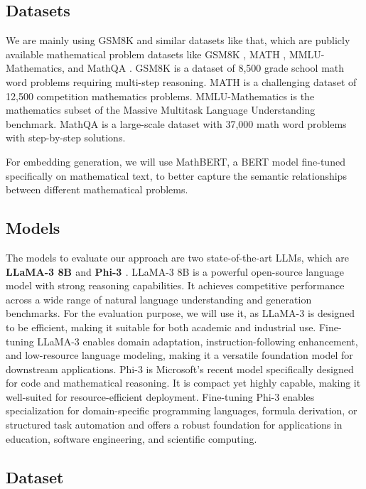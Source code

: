 \documentclass{article}
\begin{document}
\subsection{Datasets}

We are mainly using GSM8K and similar datasets like that, which are  publicly available mathematical problem datasets like GSM8K \cite{cobbe2021gsm8k}, MATH \cite{hendrycks2021math}, MMLU-Mathematics, and MathQA \cite{amini2019mathqa}. GSM8K is a dataset of 8,500 grade school math word problems requiring multi-step reasoning. MATH is a challenging dataset of 12,500 competition mathematics problems. MMLU-Mathematics is the mathematics subset of the Massive Multitask Language Understanding benchmark. MathQA is a large-scale dataset with 37,000 math word problems with step-by-step solutions.

For embedding generation, we will use MathBERT, a BERT model \cite{devlin2018bert} fine-tuned specifically on mathematical text, to better capture the semantic relationships between different mathematical problems.

\subsection{Models}

The models to evaluate our approach are two state-of-the-art LLMs, which are \textbf{LLaMA-3 8B \cite{touvron2023llama}} and \textbf{Phi-3 \cite{abdin2023phi}}. LLaMA-3 8B is a powerful open-source language model with strong reasoning capabilities. It achieves competitive performance across a wide range of natural language understanding and generation benchmarks. For the evaluation purpose, we will use it, as LLaMA-3 is designed to be efficient, making it suitable for both academic and industrial use. Fine-tuning LLaMA-3 enables domain adaptation, instruction-following enhancement, and low-resource language modeling, making it a versatile foundation model for downstream applications. Phi-3 is Microsoft's recent model specifically designed for code and mathematical reasoning. It is compact yet highly capable, making it well-suited for resource-efficient deployment. Fine-tuning Phi-3 enables specialization for domain-specific programming languages, formula derivation, or structured task automation and offers a robust foundation for applications in education, software engineering, and scientific computing.

\subsection{Dataset}
\end{document}
